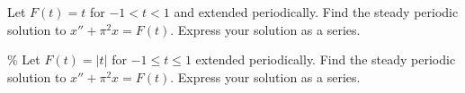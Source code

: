 \documentclass{ximera}
\begin{document}
\begin{exercise}
    Let $F(t) = t$ for $-1 < t < 1$ and extended periodically. Find the steady periodic solution to $x'' + \pi^2 x = F(t)$.  Express your solution as a series.
\end{exercise}

\begin{exercise}\%
    Let $F(t) = \lvert t \rvert$ for $-1 \leq t \leq 1$ extended periodically. Find the steady periodic solution to $x'' + \pi^2 x = F(t)$. Express your solution as a series.
\end{exercise}

\end{document}
